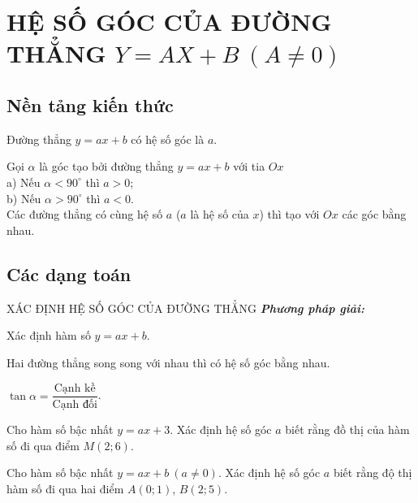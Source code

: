 \section{HỆ SỐ GÓC CỦA ĐƯỜNG THẲNG $Y=AX+B\ (A \ne 0)$}
\subsection{Nền tảng kiến thức}
\begin{enumEX}[1.]{1}
	\item Đường thẳng $y=ax+b$ có hệ số góc là $a$. 
	\item Gọi $\alpha$ là góc tạo bởi đường thẳng $y=ax+b$ với tia $Ox$\\
		\hspace{2cm} a) Nếu $\alpha < 90^\circ$ thì $a>0$;\\
		\hspace{2cm} b) Nếu $\alpha > 90^\circ$ thì $a<0$.\\
	Các đường thẳng có cùng hệ số $a$ ($a$ là hệ số của $x$) thì tạo với $Ox$ các góc bằng nhau.
\end{enumEX}
\subsection{Các dạng toán}
	\begin{dang}{XÁC ĐỊNH HỆ SỐ GÓC CỦA ĐƯỜNG THẲNG}
		\textbf{\textit{Phương pháp giải:}}
		\begin{enumEX}[1.]{1}
			\item Xác định hàm số $y=ax+b$.
			\item Hai đường thẳng song song với nhau thì có hệ số góc bằng nhau.
			\item $\tan \alpha = \dfrac{\text{Cạnh kề}}{\text{Cạnh đối}}$.
		\end{enumEX}
	\end{dang}
\begin{vd}
	Cho hàm số bậc nhất $y=ax+3$. Xác định hệ số góc $a$ biết rằng đồ thị của hàm số đi qua điểm $M(2;6)$.
\end{vd}
\begin{vd}
	Cho hàm số bậc nhất $y=ax+b \ (a \ne 0)$. Xác định hệ số góc $a$ biết rằng độ thị hàm số đi qua hai điểm $A(0;1)$, $B(2;5)$.
\end{vd}

